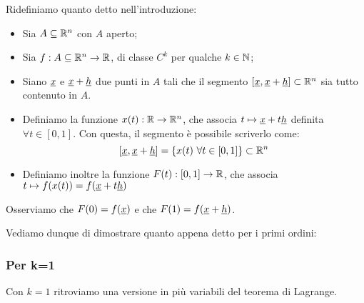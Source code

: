 Ridefiniamo quanto detto nell'introduzione:
\begin{itemize}
    \item Sia \(A \subseteq \mathbb{R}^{n} \) con \(A\) aperto;

    \item Sia \(f: A \subseteq \mathbb{R}^{n} \rightarrow \mathbb{R} \), di classe \(C^{k}\) per qualche \(k \in \mathbb{N} \);

    \item Siano \(\underline{x} \) e \(\underline{x} +\underline{h} \) due punti in \(A\) tali che il segmento \([\underline{x}, \underline{x} +\underline{h} ] \subset \mathbb{R}^{n} \) sia tutto contenuto in \(A\).

    \item Definiamo la funzione \(x(t) : \mathbb{R} \to \mathbb{R}^{n} \), che associa \(t \mapsto \underline{x}+t\underline{h} \) definita \(\forall t \in [0,1]\). Con questa, il segmento è possibile scriverlo come:
          \[
              [\underline{x} , \underline{x} +\underline{h} ] = \{x(t) ~\forall t \in [0,1]\} \subset \mathbb{R}^{n}
          \]

    \item Definiamo inoltre la funzione \(F(t) : [0,1] \to \mathbb{R} \), che associa \(t \mapsto f(x(t)) = f(\underline{x}+t\underline{h})\)
\end{itemize}

Osserviamo che \(F(0) = f(\underline{x})\) e che \(F(1) = f(\underline{x}+\underline{h})\).


Vediamo dunque di dimostrare quanto appena detto per i primi ordini:

\filbreak{}
\subsubsection*{Per k=1}

Con \(k=1\) ritroviamo una versione in più variabili del teorema di Lagrange.

